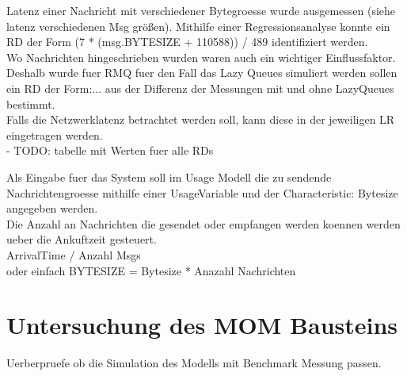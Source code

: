 Latenz einer Nachricht mit verschiedener Bytegroesse wurde ausgemessen (siehe latenz verschiedenen Msg größen). Mithilfe einer Regressionsanalyse konnte ein RD der Form (7 * (msg.BYTESIZE + 110588)) / 489 identifiziert werden.\\

Wo Nachrichten hingeschrieben wurden waren auch ein wichtiger Einflussfaktor. Deshalb wurde fuer RMQ fuer den Fall das Lazy Queues simuliert werden sollen ein RD der Form:... aus der Differenz der Messungen mit und ohne LazyQueues bestimmt. \\

Falls die Netzwerklatenz betrachtet werden soll, kann diese in der jeweiligen LR eingetragen werden.\\
- TODO: tabelle mit Werten fuer alle RDs

Als Eingabe fuer das System soll im Usage Modell die zu sendende Nachrichtengroesse mithilfe einer UsageVariable und der Characteristic: Bytesize angegeben werden.\\

Die Anzahl an Nachrichten die gesendet oder empfangen werden koennen werden ueber die Ankuftzeit gesteuert.\\
ArrivalTime / Anzahl Msgs \\
oder einfach BYTESIZE = Bytesize * Anazahl Nachrichten \\










\section{Untersuchung des MOM Bausteins}
Uerberpruefe ob die Simulation des Modells mit Benchmark Messung passen.\\

